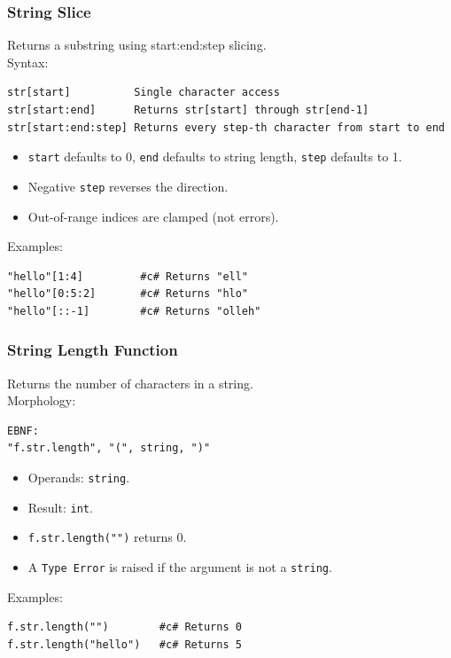 \subsubsection{String Slice}
Returns a substring using start:end:step slicing. \\
Syntax:
\begin{verbatim}
str[start]          Single character access
str[start:end]      Returns str[start] through str[end-1]
str[start:end:step] Returns every step-th character from start to end
\end{verbatim}
\begin{itemize}
\item \texttt{start} defaults to 0, \texttt{end} defaults to string length, \texttt{step} defaults to 1.
\item Negative \texttt{step} reverses the direction.
\item Out-of-range indices are clamped (not errors).
\end{itemize}
Examples:
\begin{verbatim}
"hello"[1:4]         #c# Returns "ell"
"hello"[0:5:2]       #c# Returns "hlo"
"hello"[::-1]        #c# Returns "olleh"
\end{verbatim}

\subsubsection{String Length Function}
Returns the number of characters in a string. \\
Morphology:
\begin{verbatim}
EBNF:
"f.str.length", "(", string, ")"
\end{verbatim}
\begin{itemize}
\item Operands: \texttt{string}.
\item Result: \texttt{int}.
\item \texttt{f.str.length("")} returns 0.
\item A \texttt{Type Error} is raised if the argument is not a \texttt{string}.
\end{itemize}
Examples:
\begin{verbatim}
f.str.length("")        #c# Returns 0
f.str.length("hello")   #c# Returns 5
\end{verbatim}

